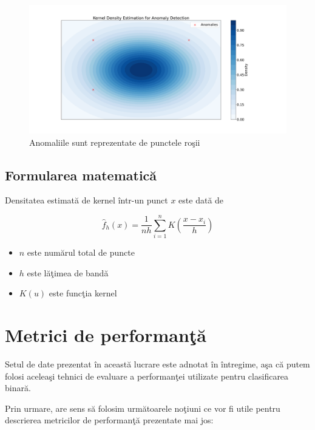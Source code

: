 \begin{figure}[H]
    \centering
    \includegraphics[width=\linewidth]{images/KDEShowOff.pdf}
    \caption{Anomaliile sunt reprezentate de punctele roşii}
\end{figure}

\subsection{Formularea matematică}

Densitatea estimată de kernel într-un punct $x$ este dată de

\begin{equation}
\hat{f}_h(x) = \frac{1}{nh} \sum_{i=1}^{n} K\left(\frac{x - x_i}{h}\right)
\end{equation}

\begin{itemize}
    \item $n$ este numărul total de puncte
    \item $h$ este lăţimea de bandă
    \item $K(u)$ este funcţia kernel 
\end{itemize}

\section{Metrici de performanţă}

Setul de date prezentat în această lucrare este adnotat în întregime, aşa 
că putem folosi aceleaşi tehnici de evaluare a performanţei utilizate pentru
clasificarea binară.

Prin urmare, are sens să folosim următoarele noţiuni ce vor fi utile pentru
descrierea metricilor de performanţă prezentate mai jos:

